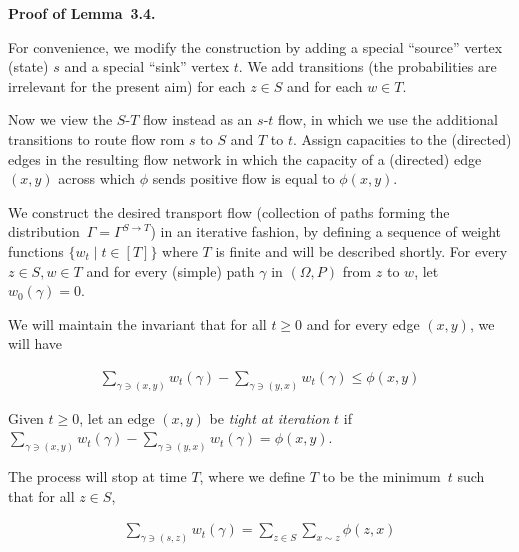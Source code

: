 \par\medskip\noindent\textbf{Proof of Lemma 3.4.}\par



For convenience, we modify the construction by adding a special “source” vertex (state) $s$ and a special “sink” vertex $t$. We add transitions (the probabilities are irrelevant for the present aim) for each $z\in S$ and for each $w\in T$.\par




Now we view the $S$-$T$ flow instead as an $s$-$t$ flow, in which we use the additional transitions to route flow rom $s$ to $S$ and $T$ to $t$. Assign capacities to the (directed) edges in the resulting flow network in which the capacity of a (directed) edge $(x,y)$ across which $\phi$ sends positive flow is equal to $\phi(x,y)$.\par




We construct the desired transport flow (collection of paths forming the distribution $\Gamma=\Gamma^{S\rightarrow T}$) in an iterative fashion, by defining a sequence of weight functions $\{w_{t}\mid t\in[T]\}$ where $T$ is finite and will be described shortly. For every $z\in S,w\in T$ and for every (simple) path $\gamma$ in $(\Omega,P)$ from $z$ to $w$, let $w_{0}(\gamma)=0$.\par




We will maintain the invariant that for all $t\geq 0$ and for every edge $(x,y)$, we will have\par


\[\begin{gathered}
\sum_{\gamma\ni(x,y)}w_{t}(\gamma)-\sum_{\gamma\ni(y,x)}w_{t}(\gamma)\leq\phi(x,y)
\end{gathered}\]




Given $t\geq 0$, let an edge $(x,y)$ be \emph{tight at iteration} $t$ if $\sum_{\gamma\ni(x,y)}w_{t}(\gamma)-\sum_{\gamma\ni(y,x)}w_{t}(\gamma)=\phi(x,y)$.\par




The process will stop at time $T$, where we define $T$ to be the minimum $t$ such that
for all $z\in S$,\par


\[\begin{gathered}
\sum_{\gamma\ni(s,z)}w_{t}(\gamma)=\sum_{z\in S}\sum_{x\sim z}\phi(z,x)
\end{gathered}\]


